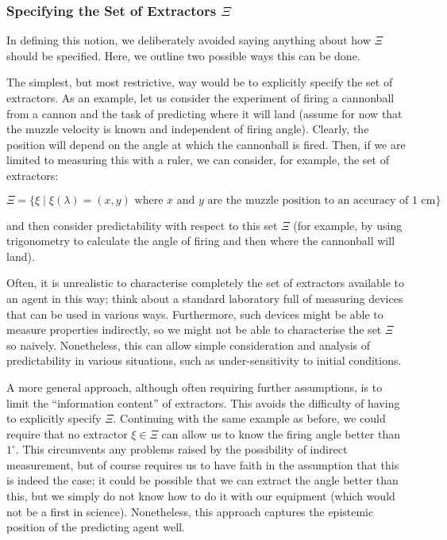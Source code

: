 \documentclass[information,article,accept,moreauthors,pdftex,12pt,a4paper]{mdpi}
\theoremstyle{mdpi}
\newcounter{ex}
\newcounter{re}
\theoremstyle{mdpidefinition}
\begin{document}
\subsubsection{Specifying the Set of Extractors $\Xi$}

In defining this notion, we deliberately avoided saying anything about how $\Xi$ should be specified.
Here, we outline two possible ways this can be done.

The simplest, but most restrictive, way would be to explicitly specify the set of extractors.
As an example, let us consider the experiment of firing a cannonball from a cannon and the task of predicting where it will land (assume for now that the muzzle velocity is known and independent of firing angle).
Clearly, the position will depend on the angle at which the cannonball is fired.
Then, if we are limited to measuring this with a ruler, we can consider, for example, the set of extractors:\vspace{-6pt}

$$\Xi=\{\xi \mid \text{$\xi(\lambda)=(x,y)$ where $x$ and $y$ are the muzzle position to an accuracy of 1 cm}\}$$

\noindent
and then consider predictability with respect to this set $\Xi$
(for example, by using trigonometry to calculate the angle of firing and then where the cannonball will land).

Often, it is unrealistic to characterise completely the set of extractors available to an agent in this way; think about a standard laboratory full of measuring devices that can be used in various ways.
Furthermore, such devices might be able to measure properties indirectly, so we might not be able to characterise the set $\Xi$ so naively.
Nonetheless, this can allow simple consideration and analysis of predictability in various situations, such as under-sensitivity to initial conditions.

A more general approach, although often requiring further assumptions, is to limit the ``information content'' of extractors.
This avoids the difficulty of having to explicitly specify $\Xi$.
Continuing with the same example as before, we could require that no extractor $\xi\in\Xi$ can allow us to know the firing angle better than  $1^\circ$.
This circumvents any problems raised by the possibility of indirect measurement, but of course requires us to have faith in the assumption that this is indeed the case;
it could be possible that we {can} extract the angle better than this, but we simply do not know how to do it with our equipment
(which would not be a first in science).
Nonetheless, this approach captures the epistemic position of the predicting agent well.
\end{document}
